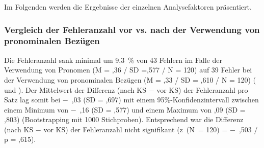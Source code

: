 
Im Folgenden werden die Ergebnisse der einzelnen Analysefaktoren präsentiert.

\subsubsection{\label{sec:5.3.4.1}Vergleich der Fehleranzahl vor vs. nach der Verwendung von pronominalen Bezügen}

Die Fehleranzahl sank minimal um 9,3~\% von 43 Fehlern im Falle der Verwendung von Pronomen (M = ,36 / SD =,577 / N = 120) auf 39 Fehler bei der Verwendung von pronominalen Bezügen (M = ,33 / SD = ,610 / N = 120) ( und ). Der Mittelwert der Differenz (nach KS $-$ vor KS) der Fehleranzahl pro Satz lag somit bei $-$~,03 (SD = ,697) mit einem 95\%\nobreakdash-Konfidenzintervall zwischen einem Minimum von $-$~,16 (SD = ,577) und einem Maximum von ,09 (SD = ,803) (Bootstrapping mit 1000 Stichproben). Entsprechend war die Differenz (nach KS $-$ vor KS) der Fehleranzahl nicht signifikant (z~(N~= 120) = $-$~,503 / p = ,615).


